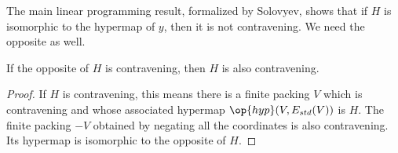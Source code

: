 The main linear programming result, formalized by Solovyev, shows
that if $H$ is isomorphic to the hypermap of $y$, then it is not
contravening.  We need the opposite as well.

\begin{lemma}
 If the opposite of $H$ is contravening, then  $H$
is also contravening.  
\end{lemma} 

\begin{proof}
  If $H$ is contravening, this means there is a finite packing $V$
  which is contravening and whose associated hypermap
  $\op{hyp}(V,E_{std}(V))$ is $H$.  The finite packing $-V$ obtained
  by negating all the coordinates is also contravening.  Its hypermap
  is isomorphic to the opposite of $H$.
\end{proof}















